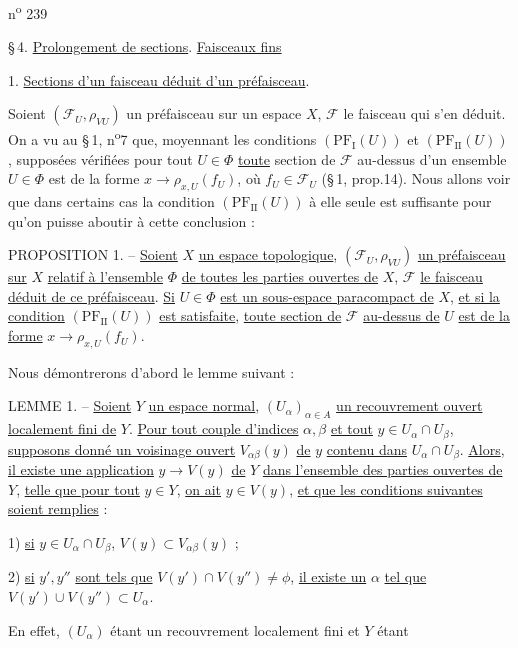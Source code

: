 n\textsuperscript{o} 239

\S\,4. \uline{Prolongement de sections}. \uline{Faisceaux fins}

1. \uline{Sections d'un faisceau déduit d'un préfaisceau}.

Soient \((\mathscr F_U,\rho_{VU})\) un préfaisceau sur un espace \(X\), \(\mathscr F\) le faisceau qui s'en déduit. On a vu au \S\,1, n\textsuperscript{o}7 que, moyennant les conditions \((\mathrm{PF}_{\mathrm I}(U))\) et \((\mathrm{PF}_{\mathrm{II}}(U))\), supposées vérifiées pour tout \(U\in\Phi\) \uline{toute} section de \(\mathscr F\) au-dessus d'un ensemble \(U\in\Phi\) est de la forme \(x\longrightarrow\rho_{x,U}(f_U)\), où \(f_U\in\mathscr F_U\) (\S\,1, prop.14). Nous allons voir que dans certains cas la condition \((\mathrm{PF}_{\mathrm{II}}(U))\) à elle seule est suffisante pour qu'on puisse aboutir à cette conclusion :

PROPOSITION 1. -- \uline{Soient} \(X\) \uline{un espace topologique}, \((\mathscr F_U,\rho_{VU})\) \uline{un préfaisceau sur} \(X\) \uline{relatif à l'ensemble} \(\Phi\) \uline{de toutes les parties ouvertes de} \(X\), \(\mathscr F\) \uline{le faisceau déduit de ce préfaisceau}. \uline{Si} \(U\in\Phi\) \uline{est un sous-espace paracompact de} \(X\), \uline{et si la condition} \((\mathrm{PF}_{\mathrm{II}}(U))\) \uline{est satisfaite}, \uline{toute section de} \(\mathscr F\) \uline{au-dessus de} \(U\) \uline{est de la forme} \(x\longrightarrow\rho_{x,U}(f_U)\).

Nous démontrerons d'abord le lemme suivant :

LEMME 1. -- \uline{Soient} \(Y\) \uline{un espace normal}, \((U_\alpha)_{\alpha\in A}\) \uline{un recouvrement ouvert localement fini de} \(Y\). \uline{Pour tout couple d'indices} \(\alpha,\beta\) \uline{et tout} \(y\in U_\alpha\cap U_\beta\), \uline{supposons donné un voisinage ouvert} \(V_{\alpha\beta}(y)\) \uline{de} \(y\) \uline{contenu dans} \(U_\alpha\cap U_\beta\). \uline{Alors}, \uline{il existe une application} \(y\longrightarrow V(y)\) \uline{de} \(Y\) \uline{dans l'ensemble des parties ouvertes de} \(Y\), \uline{telle que pour tout} \(y\in Y\), \uline{on ait} \(y\in V(y)\), \uline{et que les conditions suivantes soient remplies} :

1) \uline{si} \(y\in U_\alpha\cap U_\beta\), \(V(y)\subset V_{\alpha\beta}(y)\) ;

2) \uline{si} \(y',y''\) \uline{sont tels que} \(V(y')\cap V(y'')\ne\phi\), \uline{il existe un} \(\alpha\) \uline{tel que} \(V(y')\cup V(y'')\subset U_\alpha\).

En effet, \((U_\alpha)\) étant un recouvrement localement fini et \(Y\) étant
